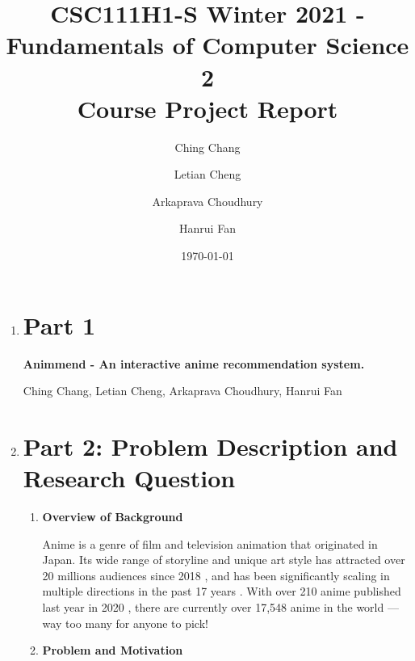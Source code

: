 \documentclass[12pt]{article}
\title{CSC111H1-S Winter 2021 - Fundamentals of Computer Science 2 \\ Course Project Report}
\author{
  Ching Chang\\
  \and
  Letian Cheng\\
  \and
  Arkaprava Choudhury\\
  \and
  Hanrui Fan
}
\date{\today}
\begin{document}
\maketitle

\newpage


\begin{enumerate}
\item \section*{Part 1}
\textbf{Animmend - An interactive anime recommendation system.}

Ching Chang, Letian Cheng, Arkaprava Choudhury, Hanrui Fan

\newpage

\item \section*{Part 2: Problem Description and Research Question}
\begin{enumerate}
    \item \textbf{Overview of Background}
    
    \quad Anime is a genre of film and television animation that originated in Japan. Its wide range of storyline and unique art style has attracted over 20 millions audiences since 2018 \citep{Ani18}, and has been significantly scaling in multiple directions in the past 17 years \citep{Ell18}. With over 210 anime published last year in 2020 \citep{wiki21}, there are currently over 17,548 anime in the world \citep{MyA21} — way too many for anyone to pick!
    
    \item \textbf{Problem and Motivation}
    

\end{enumerate}
\end{enumerate}
\end{document}
